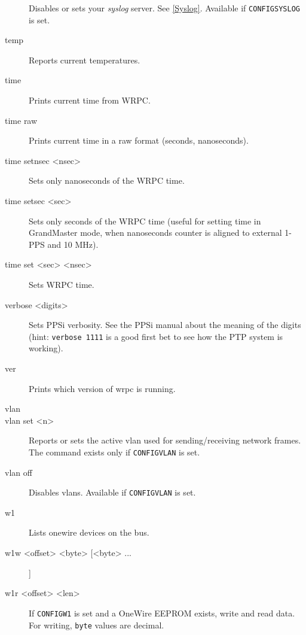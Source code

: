 \documentclass[a4paper, 12pt]{article}
\renewcommand{\_}{\underscore\allowbreak}
\begin{document}
\begin{description}
  Disables or sets your \textit{syslog} server. See
  \ref{Syslog}. Available if \texttt{CONFIG\_SYSLOG} is set.

\item[temp] \mbox{}

  Reports current temperatures.

\item[time] \mbox{}

  Prints current time from WRPC.

\item[time raw] \mbox{}

  Prints current time in a raw format (seconds, nanoseconds).

\item[time setnsec <nsec>] \mbox{}

  Sets only nanoseconds of the WRPC time.

\item[time setsec <sec>] \mbox{}

  Sets only seconds of the WRPC time (useful for setting time in
  GrandMaster mode, when nanoseconds counter is aligned to external
  1-PPS and 10 MHz).

\item[time set <sec> <nsec>] \mbox{}

  Sets WRPC time.

\item[verbose <digits>] \mbox{}

  Sets PPSi verbosity. See the PPSi manual about the meaning of the
  digits (hint: \texttt{verbose 1111} is a good first bet to see how
  the PTP system is working).

\item[ver] \mbox{}

  Prints which version of wrpc is running.

\item[vlan] \mbox{}

\item[vlan set <n>] \mbox{}

  Reports or sets the active vlan used for sending/receiving network
  frames. The command exists only if \texttt{CONFIG\_VLAN} is set.

\item[vlan off] \mbox{}

  Disables vlans. Available if \texttt{CONFIG\_VLAN} is set.

\item[w1] \mbox{}

  Lists onewire devices on the bus.

\item[w1w <offset> <byte> [<byte> ...]] \mbox{}

\item[w1r <offset> <len>] \mbox{}

  If \texttt{CONFIG\_W1} is set and a OneWire EEPROM exists, write and
  read data. For writing, \texttt{byte} values are decimal.

\end{description}
\end{document}

